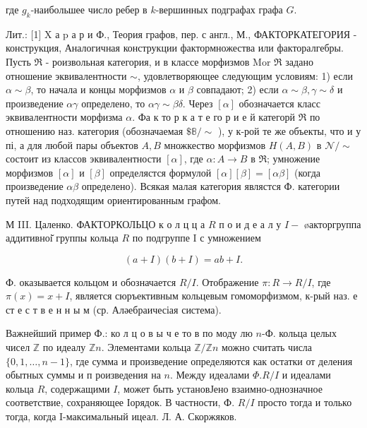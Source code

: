 \documentclass[10pt]{article}
\begin{document}
где $g_{k}$-наибольшее число ребер в $k$-вершинных подграфах графа $G$.



Лит.: [1] X а p а р и Ф., Теория графов, пер. с англ., М., ФАКТОРКАТЕГОРИЯ - конструкция, Аналогичная конструкции фактормножества или факторалгебры. Пусть $\Re$ - роизвольная категория, и в классе морфизмов Mor $\Re$ задано отношение эквивалентности $\sim$, удовлетворяющее следующим условиям: 1) если $\alpha \sim \beta$, то начала и концы морфизмов $\alpha$ и $\beta$ совпадают; 2) если $\alpha \sim \beta, \gamma \sim \delta$ и произведение $\alpha \gamma$ определено, то $\alpha \gamma \sim \beta \delta$. Через $[\alpha]$ обозначается класс эквивалентности морфизма $\alpha$. Фа к то р к а т е го р и е й категорй $\Re$ по отношению наз. категория (обозначаемая $\$ \mathbb{8} / \sim$ ), у к-рой те же объекты, что и у пі, а для любой пары объектов $A, B$ множкество морфизмов $H(A, B)$ в $\mathscr{N} / \sim$ состоит из классов эквивалентности $[\alpha]$, где $\alpha: A \longrightarrow B$ в $\mathfrak{R}$; умножение морфизмов $[\alpha]$ и $[\beta]$ определястся формулой $[\alpha][\beta]=[\alpha \beta]$ (когда произведение $\alpha \beta$ определено). Всякая малая категория являстся Ф. категории путей над подходящим ориентированным графом.



М III. Цаленко. ФАКТОРКОЛЬЦО к о л ц ц а $R$ п о и д е а л у $I-$ øакторгруппа аддитивноі̆ группы кольца $R$ по подгруппе I с умножением



\[

(a+I)(b+I)=a b+I .

\]



Ф. оказывается кольцом и обозначается $R / I$. Отображение $\pi: R \rightarrow R / I$, где $\pi(x)=x+I$, является сюръективным кольцевым гомоморфизмом, к-рый наз. е ст е с т в е н н ы м (ср. Аләебраичесіая система).



Важнейший пример Ф.: ко л ц о в ы ч е то в по моду лю $n$-Ф. кольца целых чисел $\mathbb{Z}$ по идеалу $\mathbb{Z} n$. Элементами кольца $\mathbb{Z} / \mathbb{Z} n$ можно считать числа $\{0,1, \ldots, n-1\}$, где сумма и произведение определяются как остатки от деления обытных суммы и п роизведения на $n$. Между идеалами $\Phi . R / I$ и идеалами кольца $R$, содержащими $I$, может быть установЈено взаимно-однозначное соответствие, сохраняющее Іорядок. В частности, Ф. $R / I$ просто тогда и только тогда, когда I-максимальный ицеал. Л. А. Скоржяков.
\end{document}
